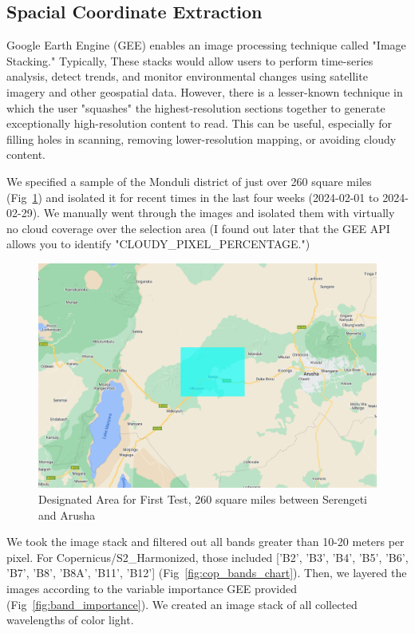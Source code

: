 \documentclass[10pt]{article}
\begin{document}
\subsection{Spacial Coordinate Extraction}

\label{procedure}

Google Earth Engine (GEE) enables an image processing technique called "Image Stacking." Typically, These stacks would allow users to perform time-series analysis, detect trends, and monitor environmental changes using satellite imagery and other geospatial data. However, there is a lesser-known technique in which the user "squashes" the highest-resolution sections together to generate exceptionally high-resolution content to read. This can be useful, especially for filling holes in scanning, removing lower-resolution mapping, or avoiding cloudy content. 

We specified a sample of the Monduli district of just over 260 square miles (Fig~\ref{fig:designated_area}) and isolated it for recent times in the last four weeks (2024-02-01 to 2024-02-29). We manually went through the images and isolated them with virtually no cloud coverage over the selection area (I found out later that the GEE API allows you to identify "CLOUDY\_PIXEL\_PERCENTAGE.")

\begin{figure} [H]
    \centering
    \includegraphics[width=1\linewidth]{images/studyarea.png}
    \caption{Designated Area for First Test, 260 square miles between Serengeti and Arusha}
    \label{fig:designated_area}
\end{figure}

We took the image stack and filtered out all bands greater than 10-20 meters per pixel. For Copernicus/S2\_Harmonized, those included ['B2', 'B3', 'B4', 'B5', 'B6', 'B7', 'B8', 'B8A', 'B11', 'B12'] (Fig~\ref{fig:cop_bands_chart}). Then, we layered the images according to the variable importance GEE provided (Fig~\ref{fig:band_importance}). We created an image stack of all collected wavelengths of color light.
\end{document}
